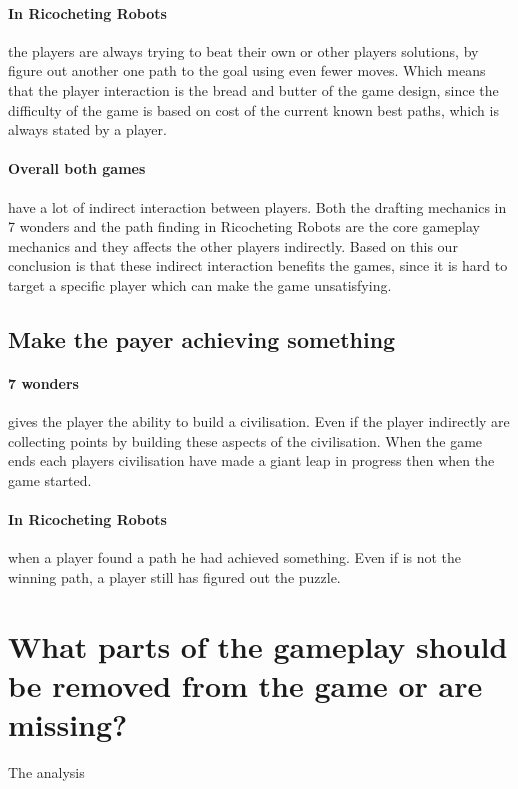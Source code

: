 \documentclass[a4paper]{article}
\begin{document}
\paragraph{In Ricocheting Robots} the players are always trying to beat their own or other players solutions, by figure out another one path to the goal using even fewer moves. Which means that the player interaction is the bread and butter of the game design, since the difficulty of the game is based on cost of the current known best paths, which is always stated by a player. 

\paragraph{Overall both games} have a lot of indirect interaction between players. Both the drafting mechanics in 7 wonders and the path finding in Ricocheting Robots are the core gameplay mechanics and they affects the other players indirectly. Based on this our conclusion is that these indirect interaction benefits the games, since it is hard to target a specific player which can make the game unsatisfying.

\subsection{Make the payer achieving something}
\paragraph{7 wonders} gives the player the ability to build a civilisation. Even if the player indirectly are collecting points by building these aspects of the civilisation. When the game ends each players civilisation have made a giant leap in progress then when the game started. 

\paragraph{In Ricocheting Robots} when a player found a path he had achieved something. Even if is not the winning path, a player still has figured out the puzzle.

\section{What parts of the gameplay should be removed from the game or are missing?}
The analysis 


\newpage


\end{document}

